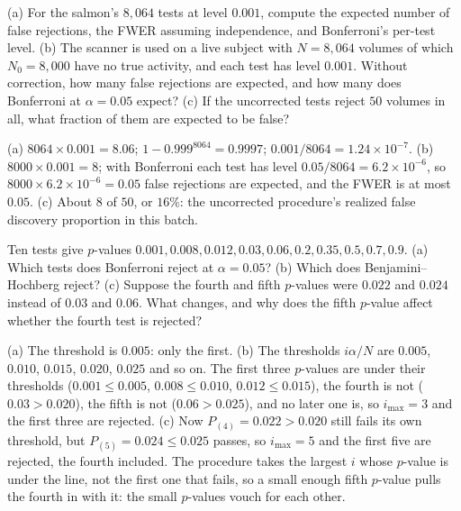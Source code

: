 \begin{exercise}
\label{ex:t-bonferroni}
(a) For the salmon's $8{,}064$ tests at level $0.001$, compute the expected number of false rejections, the FWER assuming independence, and Bonferroni's per-test level. (b) The scanner is used on a live subject with $N = 8{,}064$ volumes of which $N_0 = 8{,}000$ have no true activity, and each test has level $0.001$. Without correction, how many false rejections are expected, and how many does Bonferroni at $\alpha = 0.05$ expect? (c) If the uncorrected tests reject $50$ volumes in all, what fraction of them are expected to be false?
\end{exercise}
\begin{solution}
(a) $8064 \times 0.001 = 8.06$; $1 - 0.999^{8064} = 0.9997$; $0.001/8064 = 1.24 \times 10^{-7}$. (b) $8000 \times 0.001 = 8$; with Bonferroni each test has level $0.05/8064 = 6.2 \times 10^{-6}$, so $8000 \times 6.2 \times 10^{-6} = 0.05$ false rejections are expected, and the FWER is at most $0.05$. (c) About $8$ of $50$, or $16\%$: the uncorrected procedure's realized false discovery proportion in this batch.
\end{solution}

\begin{exercise}
\label{ex:t-bh}
Ten tests give $p$-values $0.001, 0.008, 0.012, 0.03, 0.06, 0.2, 0.35, 0.5, 0.7, 0.9$. (a) Which tests does Bonferroni reject at $\alpha = 0.05$? (b) Which does Benjamini--Hochberg reject? (c) Suppose the fourth and fifth $p$-values were $0.022$ and $0.024$ instead of $0.03$ and $0.06$. What changes, and why does the fifth $p$-value affect whether the fourth test is rejected?
\end{exercise}
\begin{solution}
(a) The threshold is $0.005$: only the first. (b) The thresholds $i\alpha/N$ are $0.005$, $0.010$, $0.015$, $0.020$, $0.025$ and so on. The first three $p$-values are under their thresholds ($0.001 \leq 0.005$, $0.008 \leq 0.010$, $0.012 \leq 0.015$), the fourth is not ($0.03 > 0.020$), the fifth is not ($0.06 > 0.025$), and no later one is, so $i_{\max} = 3$ and the first three are rejected. (c) Now $P_{(4)} = 0.022 > 0.020$ still fails its own threshold, but $P_{(5)} = 0.024 \leq 0.025$ passes, so $i_{\max} = 5$ and the first five are rejected, the fourth included. The procedure takes the largest $i$ whose $p$-value is under the line, not the first one that fails, so a small enough fifth $p$-value pulls the fourth in with it: the small $p$-values vouch for each other.
\end{solution}
